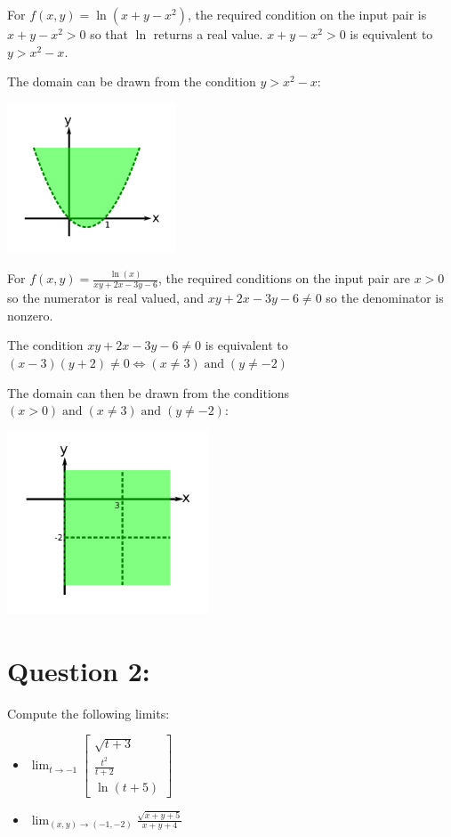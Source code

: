 \documentclass{article}
\newcommand{\colvec}[3]{\begin{bmatrix} #1 \\ #2 \\ #3 \end{bmatrix}}
\newcommand{\dr}[1]{\textcolor{dark_red}{#1}}
\begin{document}
\dr{For \(f(x,y) = \ln(x + y - x^2)\), the required condition on the input pair is \(x + y - x^2 > 0\) so that \(\ln\) returns a real value. \(x + y - x^2 > 0\) is equivalent to \(y > x^2 - x\).} 

\dr{The domain can be drawn from the condition \(y > x^2 - x\):}

\includegraphics[width = 5cm]{Test_bench_part_2b_images/Question_1_part_2}

\dr{For \(f(x,y) = \frac{\ln(x)}{xy + 2x - 3y - 6}\), the required conditions on the input pair are \(x > 0\) so the numerator is real valued, and \(xy + 2x - 3y - 6 \neq 0\) so the denominator is nonzero.} 

\dr{The condition \(xy + 2x - 3y - 6 \neq 0\) is equivalent to \((x - 3)(y + 2) \neq 0 \iff (x \neq 3) \;\text{and}\; (y \neq -2)\)}

\dr{The domain can then be drawn from the conditions \((x > 0) \;\text{and}\; (x \neq 3) \;\text{and}\; (y \neq -2)\):}

\includegraphics[width = 6cm]{Test_bench_part_2b_images/Question_1_part_3}

\vspace{0.5cm}


\section*{Question 2:}

Compute the following limits:

\begin{itemize}
\item \(\lim_{t \to -1} \colvec{\sqrt{t + 3}}{\frac{t^2}{t+2}}{\ln(t + 5)}\)
\item \(\lim_{(x,y) \to (-1,-2)} \frac{\sqrt{x+y+5}}{x+y+4}\)
\end{itemize}
\end{document}
